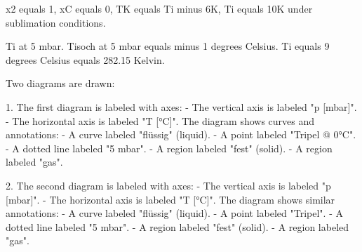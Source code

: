 x2 equals 1, xC equals 0, TK equals Ti minus 6K, Ti equals 10K under sublimation conditions.  

Ti at 5 mbar.  
Tisoch at 5 mbar equals minus 1 degrees Celsius.  
Ti equals 9 degrees Celsius equals 282.15 Kelvin.  

Two diagrams are drawn:  

1. The first diagram is labeled with axes:  
- The vertical axis is labeled "p [mbar]".  
- The horizontal axis is labeled "T [°C]".  
The diagram shows curves and annotations:  
- A curve labeled "flüssig" (liquid).  
- A point labeled "Tripel @ 0°C".  
- A dotted line labeled "5 mbar".  
- A region labeled "fest" (solid).  
- A region labeled "gas".  

2. The second diagram is labeled with axes:  
- The vertical axis is labeled "p [mbar]".  
- The horizontal axis is labeled "T [°C]".  
The diagram shows similar annotations:  
- A curve labeled "flüssig" (liquid).  
- A point labeled "Tripel".  
- A dotted line labeled "5 mbar".  
- A region labeled "fest" (solid).  
- A region labeled "gas".